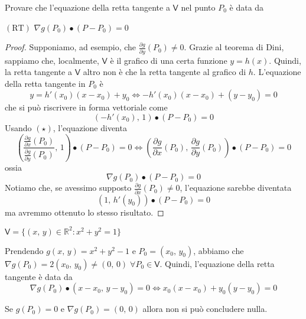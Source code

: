 \begin{exer}
Provare che l'equazione della retta tangente a $\mathsf{V}$ nel punto $P_0$ è data da
\begin{center}
$\mathrm{(RT)}$
\hfill
$\displaystyle
\nabla g(P_0) \bullet (P-P_0) = 0
$
\hfill \null \\
\end{center}
\end{exer}
\begin{proof}
Supponiamo, ad esempio, che $\frac{\partial g}{\partial y}(P_0) \neq 0$. Grazie al teorema di Dini, sappiamo che, localmente, $\mathsf{V}$ è il grafico di una certa funzione $y = h(x)$. Quindi, la retta tangente a $\mathsf{V}$ altro non è che la retta tangente al grafico di $h$. L'equazione della retta tangente in $P_0$ è
$$
y = h'(x_0)(x-x_0) + y_0 \Longleftrightarrow -h'(x_0)(x-x_0) + (y-y_0) = 0
$$
che si può riscrivere in forma vettoriale come
$$
(-h'(x_0),\,1) \bullet (P-P_0) = 0
$$
Usando $\mathrm{(\star)}$, l'equazione diventa
$$
\left( \frac{\displaystyle \frac{\partial g}{\partial x} \left( P_0 \right)}{\displaystyle \frac{\partial g}{\partial y} \left( P_0 \right)},\,1 \right) \bullet (P-P_0) = 0
\Longleftrightarrow
\left(\frac{\partial g}{\partial x} \left( P_0 \right),\,\frac{\partial g}{\partial y} \left( P_0 \right) \right) \bullet (P-P_0) = 0
$$
ossia
$$
\nabla g(P_0) \bullet (P-P_0) = 0
$$
Notiamo che, se avessimo supposto $\frac{\partial g}{\partial x}(P_0) \neq 0$, l'equazione sarebbe diventata
$$
(1,\,h'(y_0)) \bullet (P-P_0) = 0
$$
ma avremmo ottenuto lo stesso risultato.
\end{proof}

\begin{example}
$\mathsf{V} = \lbrace (x,\,y) \in \mathbb{R}^2 : x^2 + y^2 = 1 \rbrace$
\begin{center}
\def\svgwidth{6cm}

\end{center}
Prendendo $g(x,\,y) = x^2 + y^2 - 1$ e $P_0 = (x_0,\,y_0)$, abbiamo che $\nabla g(P_0) = 2(x_0,\,y_0) \neq (0,\,0) \; \forall P_0 \in \mathsf{V}$. Quindi, l'equazione della retta tangente è data da
$$
\nabla g(P_0) \bullet (x-x_0,\,y-y_0) = 0 \Longleftrightarrow x_0(x-x_0) + y_0(y-y_0) = 0 
$$
\end{example}

\begin{obs}[ii]
Se $g(P_0) = 0$ e $\nabla g(P_0) = (0,\,0)$ allora non si può concludere nulla.
\end{obs}

